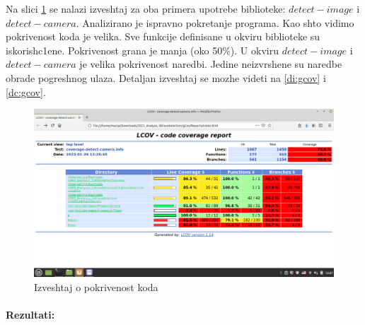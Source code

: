 \documentclass{article}
\begin{document}
\selectfont
Na slici \ref{covd:gcov} se nalazi izveshtaj za oba primera upotrebe biblioteke: $detect-image$ i $detect-camera.$ Analizirano je ispravno pokretanje programa. Kao shto vidimo pokrivenost koda je velika. Sve funkcije definisane u okviru biblioteke su iskorish\-c1ene. Pokrivenost grana je manja (oko 50\%). U okviru $detect-image$ i $detect-camera$ je velika pokrivenost naredbi. Jedine neizvrshene su naredbe obrade pogreshnog ulaza. Detaljan izveshtaj se mozhe videti na \ref{di:gcov} i \ref{dc:gcov}.
\begin{figure}[H]
    \centering
    \includegraphics[width=12cm]{img/gcov/gcovCoverageDetect.png}
    \caption{Izveshtaj o pokrivenost koda}
    \label{covd:gcov}
\end{figure}

\paragraph{Rezultati:}
\end{document}
